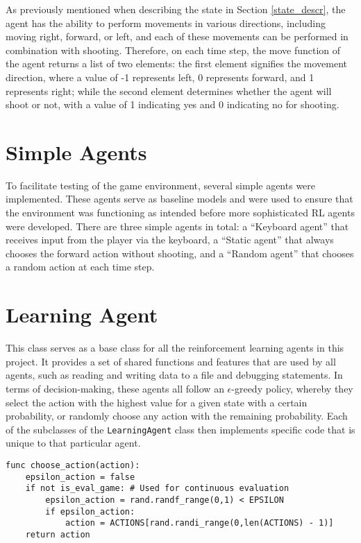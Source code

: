 As previously mentioned when describing the state in Section \ref{state_descr}, the agent has the ability to perform movements in various directions, including moving right, forward, or left, and each of these movements can be performed in combination with shooting. Therefore, on each time step, the move function of the agent returns a list of two elements: the first element signifies the movement direction, where a value of -1 represents left, 0 represents forward, and 1 represents right; while the second element determines whether the agent will shoot or not, with a value of 1 indicating yes and 0 indicating no for shooting.


\section{Simple Agents}
To facilitate testing of the game environment, several simple agents were implemented. These agents serve as baseline models and were used to ensure that the environment was functioning as intended before more sophisticated RL agents were developed. There are three simple agents in total: a ``Keyboard agent'' that receives input from the player via the keyboard, a ``Static agent'' that always chooses the forward action without shooting, and a ``Random agent'' that chooses a random action at each time step. 

\section{Learning Agent}
This class serves as a base class for all the reinforcement learning agents in this project. It provides a set of shared functions and features that are used by all agents, such as reading and writing data to a file and debugging statements. In terms of decision-making, these agents all follow an $\epsilon$-greedy policy, whereby they select the action with the highest value for a given state with a certain probability, or randomly choose any action with the remaining probability. Each of the subclasses of the \texttt{LearningAgent} class then implements specific code that is unique to that particular agent.

\begin{center}
\hrulefill
\begin{lstlisting}
func choose_action(action):
    epsilon_action = false
    if not is_eval_game: # Used for continuous evaluation
        epsilon_action = rand.randf_range(0,1) < EPSILON
        if epsilon_action:
            action = ACTIONS[rand.randi_range(0,len(ACTIONS) - 1)]  
    return action
\end{lstlisting}
\hrulefill
\end{center}

